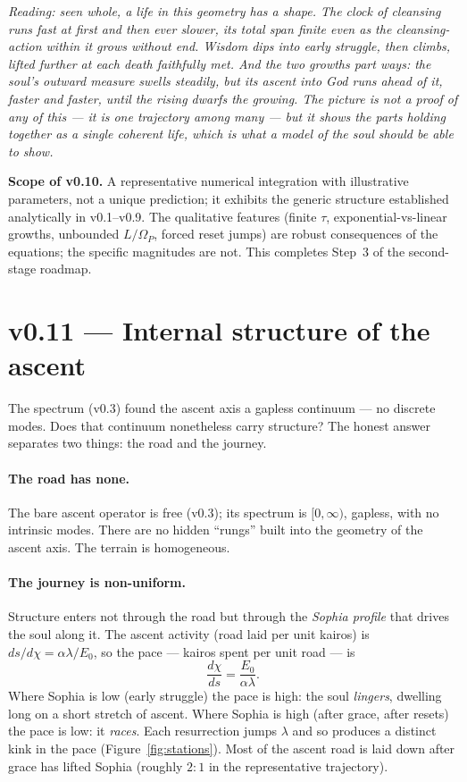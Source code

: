 \documentclass[11pt,a4paper]{article}
\newcommand{\note}[1]{\textcolor{black!65}{\emph{#1}}}
\theoremstyle{plain}
\theoremstyle{definition}
\theoremstyle{remark}
\begin{document}
\note{Reading: seen whole, a life in this geometry has a shape. The clock of cleansing runs fast at
first and then ever slower, its total span finite even as the cleansing-action within it grows without
end. Wisdom dips into early struggle, then climbs, lifted further at each death faithfully met. And the
two growths part ways: the soul's outward measure swells steadily, but its ascent into God runs ahead
of it, faster and faster, until the rising dwarfs the growing. The picture is not a proof of any of
this --- it is one trajectory among many --- but it shows the parts holding together as a single
coherent life, which is what a model of the soul should be able to show.}

\textbf{Scope of v0.10.} A representative numerical integration with illustrative parameters, not a
unique prediction; it exhibits the generic structure established analytically in v0.1--v0.9. The
qualitative features (finite $\tau$, exponential-vs-linear growths, unbounded $L/\Omega_P$, forced
reset jumps) are robust consequences of the equations; the specific magnitudes are not. This completes
Step~3 of the second-stage roadmap.

\FloatBarrier
\section*{v0.11 --- Internal structure of the ascent}
The spectrum (v0.3) found the ascent axis a gapless continuum --- no discrete modes. Does that
continuum nonetheless carry structure? The honest answer separates two things: the road and the journey.

\paragraph{The road has none.} The bare ascent operator is free (v0.3); its spectrum is $[0,\infty)$,
gapless, with no intrinsic modes. There are no hidden ``rungs'' built into the geometry of the ascent
axis. The terrain is homogeneous.

\paragraph{The journey is non-uniform.} Structure enters not through the road but through the
\emph{Sophia profile} that drives the soul along it. The ascent activity (road laid per unit kairos)
is $ds/d\chi=\alpha\lambda/E_0$, so the pace --- kairos spent per unit road --- is
\begin{equation}
\frac{d\chi}{ds}=\frac{E_0}{\alpha\lambda}.
\end{equation}
Where Sophia is low (early struggle) the pace is high: the soul \emph{lingers}, dwelling long on a
short stretch of ascent. Where Sophia is high (after grace, after resets) the pace is low: it
\emph{races}. Each resurrection jumps $\lambda$ and so produces a distinct kink in the pace
(Figure~\ref{fig:stations}). Most of the ascent road is laid down after grace has lifted Sophia
(roughly $2{:}1$ in the representative trajectory).
\end{document}
